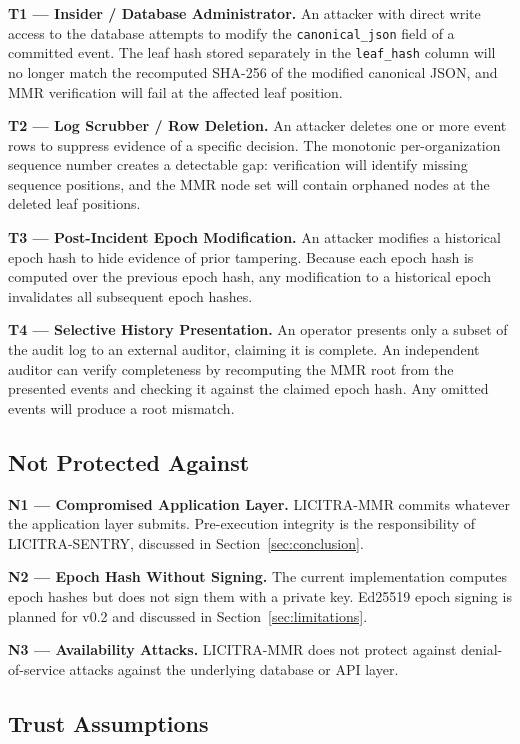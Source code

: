 \documentclass[sigconf,natbib=false]{acmart}
\begin{document}
\textbf{T1 --- Insider / Database Administrator.} An attacker with direct
write access to the database attempts to modify the \texttt{canonical\_json}
field of a committed event. The leaf hash stored separately in the
\texttt{leaf\_hash} column will no longer match the recomputed SHA-256 of
the modified canonical JSON, and MMR verification will fail at the affected
leaf position.

\textbf{T2 --- Log Scrubber / Row Deletion.} An attacker deletes one or
more event rows to suppress evidence of a specific decision. The monotonic
per-organization sequence number creates a detectable gap: verification
will identify missing sequence positions, and the MMR node set will contain
orphaned nodes at the deleted leaf positions.

\textbf{T3 --- Post-Incident Epoch Modification.} An attacker modifies a
historical epoch hash to hide evidence of prior tampering. Because each
epoch hash is computed over the previous epoch hash, any modification to a
historical epoch invalidates all subsequent epoch hashes.

\textbf{T4 --- Selective History Presentation.} An operator presents only
a subset of the audit log to an external auditor, claiming it is complete.
An independent auditor can verify completeness by recomputing the MMR root
from the presented events and checking it against the claimed epoch hash.
Any omitted events will produce a root mismatch.

\subsection{Not Protected Against}

\textbf{N1 --- Compromised Application Layer.} LICITRA-MMR commits whatever
the application layer submits. Pre-execution integrity is the responsibility
of LICITRA-SENTRY, discussed in Section~\ref{sec:conclusion}.

\textbf{N2 --- Epoch Hash Without Signing.} The current implementation
computes epoch hashes but does not sign them with a private key. Ed25519
epoch signing is planned for v0.2 and discussed in Section~\ref{sec:limitations}.

\textbf{N3 --- Availability Attacks.} LICITRA-MMR does not protect against
denial-of-service attacks against the underlying database or API layer.

\subsection{Trust Assumptions}
\label{sec:trust}
\end{document}
